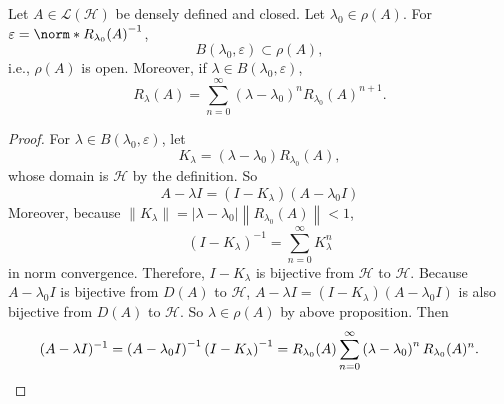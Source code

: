\documentclass[a4paper,12pt]{article}
\begin{document}
\begin{prop}
    Let $A \in \mathcal{L}(\mathcal{H})$ be densely defined and closed. Let $\lambda_0 \in \rho(A)$. For $\varepsilon = \norm*{R_{\lambda_0}(A)}^{-1}$,
    \begin{equation*}
        B(\lambda_0,\varepsilon) \subset \rho(A),
    \end{equation*}
    i.e., $\rho(A)$ is open. Moreover, if $\lambda \in B(\lambda_0, \varepsilon)$,
    \begin{equation*}
        R_\lambda(A) = \sum_{n=0}^\infty (\lambda - \lambda_0)^nR_{\lambda_0}(A)^{n+1}.
    \end{equation*}
\end{prop}
\begin{proof}
    For $\lambda \in B(\lambda_0, \varepsilon)$, let
    \begin{equation*}
        K_\lambda = (\lambda - \lambda_0)R_{\lambda_0}(A),
    \end{equation*}
    whose domain is $\mathcal{H}$ by the definition. So
    \begin{equation*}
        A - \lambda I= (I - K_\lambda)(A - \lambda_0 I)
    \end{equation*}
    Moreover, because $\left\|K_\lambda\right\|=\left|\lambda-\lambda_0\right|\left\|R_{\lambda_0}(A)\right\|<1$,
    \begin{equation*}
        \left(I-K_\lambda\right)^{-1}=\sum_{n=0}^{\infty} K_\lambda^n
    \end{equation*}
    in norm convergence. Therefore, $I-K_\lambda$ is bijective from $\mathcal{H}$ to $\mathcal{H}$. Because $A - \lambda_0 I$ is bijective from $D(A)$ to $\mathcal{H}$, $A - \lambda I= (I - K_\lambda)(A - \lambda_0 I)$ is also bijective from $D(A)$ to $\mathcal{H}$. So $\lambda \in \rho(A)$ by above proposition. Then
    \begin{equation*}
        (A-\lambda I)^{-1}=\left(A-\lambda_0 I\right)^{-1}\left(I-K_\lambda\right)^{-1}=R_{\lambda_0}(A) \sum_{n=0}^{\infty}\left(\lambda-\lambda_0\right)^n R_{\lambda_0}(A)^n. \qedhere
    \end{equation*}
\end{proof}
\end{document}
